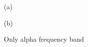 \begin{figure}[h!]
\begin{minipage}[h]{0.49\linewidth}
 (a) \\
\end{minipage}
\hfill
\begin{minipage}[h]{0.5\linewidth}
 (b) \\
\end{minipage}
\caption{Only alpha frequency band} 
\end{figure}

